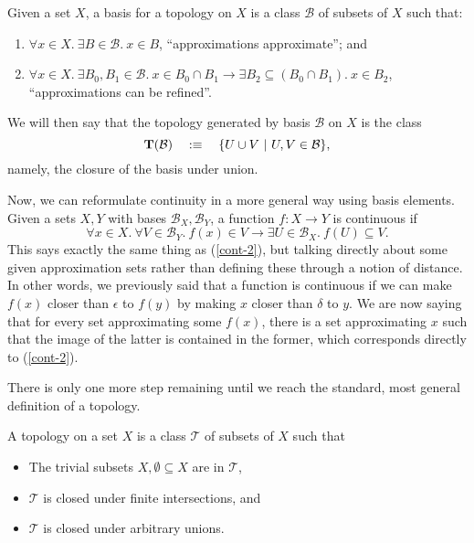 \begin{defn}
  Given a set $X$, a basis for a topology on $X$ is a class $\mathcal{B}$ of subsets of
  $X$ such that:
  \begin{enumerate}
    \item $\forall x \in X.~ \exists B \in \mathcal{B}.~x \in B$, ``approximations approximate''; and
    \item $\forall x \in X.~ \exists B_0, B_1 \in \mathcal{B}.~ x \in B_0 \cap B_1 \rightarrow \exists B_2 \subseteq (B_0 \cap B_1).~
      x \in B_2$, ``approximations can be refined''.
  \end{enumerate}
\end{defn}

We will then say that the topology generated by basis $\mathcal{B}$ on $X$ is the class
\begin{equation*}
  \mathbf{T}(\mathcal{B}) \quad:\equiv\quad \{ U \cup V~|~U, V \in \mathcal{B} \},
\end{equation*}
namely, the closure of the basis under union.

Now, we can reformulate continuity in a more general way using basis elements. Given a
sets $X, Y$ with bases $\mathcal{B}_X, \mathcal{B}_Y$, a function $f : X \rightarrow Y$ is
continuous if
\begin{equation}\label{cont-basis}
  \forall x \in X.~ \forall V \in \mathcal{B}_Y.~ f(x) \in V \rightarrow \exists U \in \mathcal{B}_X.~
    f(U) \subseteq V.
\end{equation}
This says exactly the same thing as (\ref{cont-2}), but talking directly about some given
approximation sets rather than defining these through a notion of distance. In other
words, we previously said that a function is continuous if we can make $f(x)$ closer than
$\epsilon$ to $f(y)$ by making $x$ closer than $\delta$ to $y$. We are now saying that for every
set approximating some $f(x)$, there is a set approximating $x$ such that the image of
the latter is contained in the former, which corresponds directly to (\ref{cont-2}).

There is only one more step remaining until we reach the standard, most general definition
of a topology.

\begin{defn}
  A topology on a set $X$ is a class $\mathcal{T}$ of subsets of $X$ such that
  \begin{itemize}
  \item The trivial subsets $X, \emptyset \subseteq X$ are in $\mathcal{T}$,
  \item $\mathcal{T}$ is closed under finite intersections, and
  \item $\mathcal{T}$ is closed under arbitrary unions.
  \end{itemize}
\end{defn}

